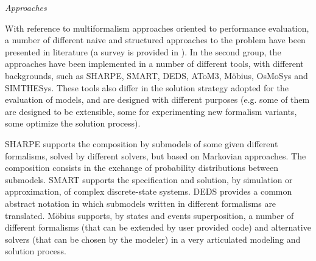 \emph{Approaches} 

With reference to multiformalism approaches oriented to performance evaluation,
a number of different naive and structured approaches to the problem have been
presented in literature (a survey is provided in
\cite{MarinMultiformalismSurvey}). In the second group, the approaches have been
implemented in a number of different tools, with different backgrounds, such as
SHARPE, SMART, DEDS, AToM3, M\"obius, OsMoSys and SIMTHESys. These tools also
differ in the solution strategy adopted for the evaluation of models, and are
designed with different purposes (e.g. some of them are designed to be
extensible, some for experimenting new formalism variants, some optimize the
solution process).

SHARPE \cite{SHARPE02} supports the composition by submodels of some given
different formalisms, solved by different solvers, but based on Markovian
approaches. The composition consists in the exchange of probability
distributions between submodels. SMART
\cite{1348056}\cite{Ciardo:2009:AFS:1530873.1530885}\cite{SMART2006} supports
the specification and solution, by simulation or approximation, of complex
discrete-state systems. DEDS \cite{Bause:1998:TFQ:647808.737654} provides a
common abstract notation in which submodels written in different formalisms are
translated. M\"obius
\cite{796527}\cite{Clark:2001:MMT:882474.883479}\cite{conf/dsn/CourtneyGKRS09}\cite{MOBIUS02}
supports, by states and events superposition, a number of different formalisms
(that can be extended by user provided code) and alternative solvers (that can
be chosen by the modeler) in a very articulated modeling and solution process.

